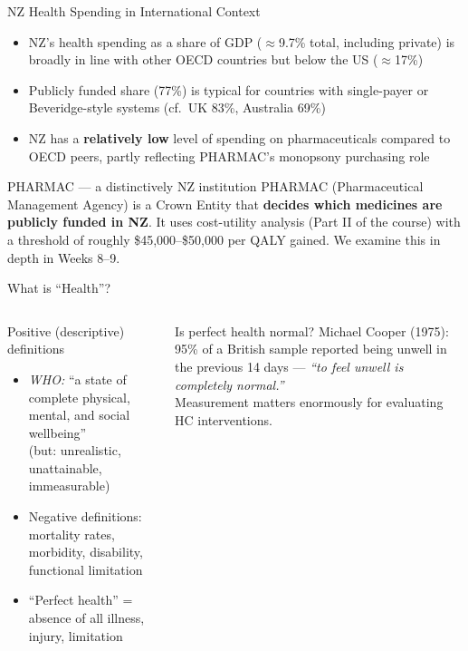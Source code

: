 \documentclass[aspectratio=169, 12pt]{beamer}
\begin{document}
\begin{frame}{NZ Health Spending in International Context}
  \begin{itemize}
    \item NZ's health spending as a share of GDP ($\approx$9.7\% total, including private)
          is broadly in line with other OECD countries but below the US ($\approx$17\%)
    \item Publicly funded share (77\%) is typical for countries with single-payer or
          Beveridge-style systems (cf.\ UK 83\%, Australia 69\%)
    \item NZ has a \textbf{relatively low} level of spending on pharmaceuticals compared
          to OECD peers, partly reflecting PHARMAC's monopsony purchasing role
  \end{itemize}
  \begin{exampleblock}{PHARMAC --- a distinctively NZ institution}
    PHARMAC (Pharmaceutical Management Agency) is a Crown Entity that \textbf{decides which
    medicines are publicly funded in NZ}. It uses cost-utility analysis (Part II of the course)
    with a threshold of roughly \$45,000--\$50,000 per QALY gained. We examine this in
    depth in Weeks 8--9.
  \end{exampleblock}
\end{frame}

\begin{frame}{What is ``Health''?}
  \begin{columns}
      \begin{block}{Positive (descriptive) definitions}
        \begin{itemize}
          \item \textit{WHO:} ``a state of complete physical, mental, and social wellbeing''\\
                {\footnotesize (but: unrealistic, unattainable, immeasurable)}
          \item Negative definitions: mortality rates, morbidity, disability, functional limitation
          \item ``Perfect health'' = absence of all illness, injury, limitation
        \end{itemize}
      \end{block}
      \begin{alertblock}{Is perfect health normal?}
        Michael Cooper (1975): 95\% of a British sample reported being unwell in the
        previous 14 days --- \emph{``to feel unwell is completely normal.''}\\[0.3em]
        Measurement matters enormously for evaluating HC interventions.
      \end{alertblock}
  \end{columns}
\end{frame}
\end{document}
